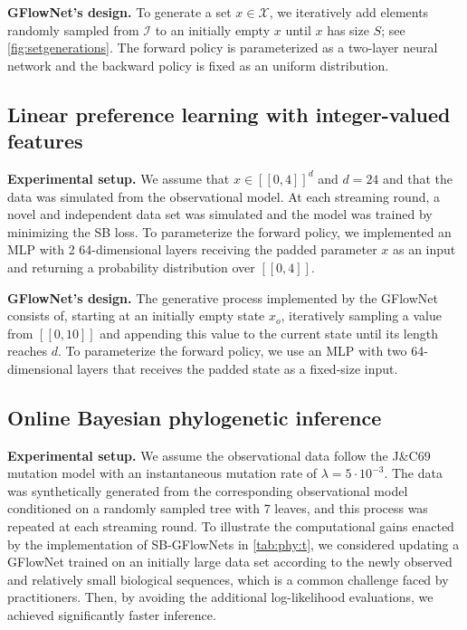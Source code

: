 \documentclass{article}
\newcommand{\pp}[1]{\vspace{0pt}\noindent\textbf{#1}}
\theoremstyle{plain}
\theoremstyle{definition}
\theoremstyle{remark}
\theoremstyle{remark}
\begin{document}
\pp{GFlowNet's design.} To generate a set $x \in \mathcal{X}$, we iteratively add elements randomly sampled from $\mathcal{I}$ to an initially empty $x$ until $x$ has size $S$; see \autoref{fig:setgenerations}. The forward policy is parameterized as a two-layer neural network and the backward policy is fixed as an uniform distribution. 

\subsection{Linear preference learning with integer-valued features} 

\pp{Experimental setup.} We assume that $x \in [[0, 4]]^{d}$ and $d = 24$ and that the data was simulated from the observational model. At each streaming round, a novel and independent data set was simulated and the model was trained by minimizing the SB loss. To parameterize the forward policy, we implemented an MLP with 2 64-dimensional layers receiving the padded parameter $x$ as an input and returning a probability distribution over $[[0, 4]]$.    

\pp{GFlowNet's design.} The generative process implemented by the GFlowNet consists of, starting at an initially empty state $x_{o}$, iteratively sampling a value from $[[0, 10]]$ and appending this value to the current state until its length reaches $d$. To parameterize the forward policy, we use an MLP with two 64-dimensional layers that receives the padded state as a fixed-size input. 

\subsection{Online Bayesian phylogenetic inference} 

\pp{Experimental setup.} We assume the observational data follow the J\&C69 mutation model with an instantaneous mutation rate of $\lambda = 5 \cdot 10^{-3}$. The data was synthetically generated from the corresponding observational model conditioned on a randomly sampled tree with 7 leaves, and this process was repeated at each streaming round. To illustrate the computational gains enacted by the implementation of SB-GFlowNets in \autoref{tab:phy:t}, we considered updating a GFlowNet trained on an initially large data set according to the newly observed and relatively small biological sequences, which is a common challenge faced by practitioners. Then, by avoiding the additional log-likelihood evaluations, we achieved significantly faster inference.
\end{document}
